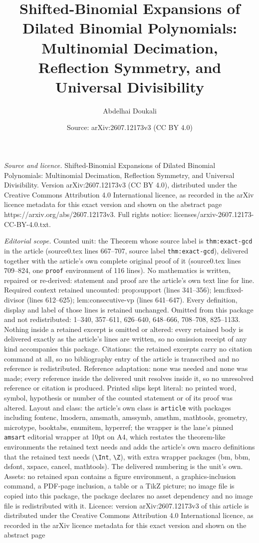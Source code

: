 \documentclass[10pt,a4paper]{amsart}
\title[Shifted-Binomial Expansions of Dilated Binomial Polynomials:]{Shifted-Binomial Expansions of Dilated Binomial Polynomials: Multinomial Decimation, Reflection Symmetry, and Universal Divisibility}
\author{Abdelhai Doukali}
\date{Source: arXiv:2607.12173v3 (CC BY 4.0)}
\begin{document}
\maketitle

\noindent\emph{Source and licence.} Shifted-Binomial Expansions of Dilated Binomial Polynomials: Multinomial Decimation, Reflection Symmetry, and Universal Divisibility. Version arXiv:2607.12173v3 (CC BY 4.0), distributed under the Creative Commons Attribution 4.0 International licence, as recorded in the arXiv licence metadata for this exact version and shown on the abstract page https://arxiv.org/abs/2607.12173v3. Full rights notice: licenses/arxiv-2607.12173-CC-BY-4.0.txt.\par\smallskip

\noindent\textit{Editorial scope.} Counted unit: the Theorem whose source label is \texttt{thm:exact-gcd} in the article (source0.tex lines 667--707, source label \texttt{thm:exact-gcd}), delivered together with the article's own complete original proof of it (source0.tex lines 709--824, one \texttt{proof} environment of 116 lines). No mathematics is written, repaired or re-derived: statement and proof are the article's own text line for line. Required context retained uncounted: prop:support (lines 341--356); lem:fixed-divisor (lines 612--625); lem:consecutive-vp (lines 641--647). Every definition, display and label of those lines is retained unchanged. Omitted from this package and not redistributed: 1--340, 357--611, 626--640, 648--666, 708--708, 825--1133. Nothing inside a retained excerpt is omitted or altered: every retained body is delivered exactly as the article's lines are written, so no omission receipt of any kind accompanies this package. Citations: the retained excerpts carry no citation command at all, so no bibliography entry of the article is transcribed and no reference is redistributed. Reference adaptation: none was needed and none was made; every reference inside the delivered unit resolves inside it, so no unresolved reference or citation is produced. Printed slips kept literal: no printed word, symbol, hypothesis or number of the counted statement or of its proof was altered. Layout and class: the article's own class is \texttt{article} with packages including fontenc, lmodern, amsmath, amssymb, amsthm, mathtools, geometry, microtype, booktabs, enumitem, hyperref; the wrapper is the lane's pinned \texttt{amsart} editorial wrapper at 10pt on A4, which restates the theorem-like environments the retained text needs and adds the article's own macro definitions that the retained text needs (\texttt{\textbackslash Int}, \texttt{\textbackslash Z}), with extra wrapper packages (bm, bbm, dsfont, xspace, cancel, mathtools). The delivered numbering is the unit's own. Assets: no retained span contains a figure environment, a graphics-inclusion command, a PDF-page inclusion, a table or a TikZ picture; no image file is copied into this package, the package declares no asset dependency and no image file is redistributed with it. Licence: version arXiv:2607.12173v3 of this article is distributed under the Creative Commons Attribution 4.0 International licence, as recorded in the arXiv licence metadata for this exact version and shown on the abstract page 
\end{document}
